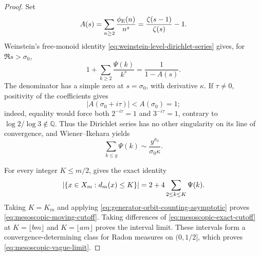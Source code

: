 \begin{proof}
Set
\[
 A(s)=\sum_{n\ge2}\frac{\phi_{\rm E}(n)}{n^s}
 =\frac{\zeta(s-1)}{\zeta(s)}-1.
\]
Weinstein's free-monoid identity \eqref{eq:weinstein-level-dirichlet-series}
gives, for \(\Re s>\sigma_0\),
\[
 1+\sum_{k\ge2}\frac{\Psi(k)}{k^s}=\frac1{1-A(s)}.
\]
The denominator has a simple zero at \(s=\sigma_0\), with derivative
\(\kappa\).  If \(\tau\ne0\), positivity of the coefficients gives
\[
 |A(\sigma_0+i\tau)|<A(\sigma_0)=1;
\]
indeed, equality would force both \(2^{-i\tau}=1\) and
\(3^{-i\tau}=1\), contrary to \(\log2/\log3\notin\mathbb Q\).
Thus the Dirichlet series has no other singularity on its line of
convergence, and Wiener--Ikehara \cite{Korevaar2004} yields
\begin{equation}
 \sum_{k\le y}\Psi(k)
 \sim\frac{y^{\sigma_0}}{\sigma_0\kappa}.
 \label{eq:generator-orbit-counting-asymptotic}
\end{equation}

For every integer \(K\le m/2\),  gives the
exact identity
\begin{equation}
 \lvert \{x\in X_m:d_m(x)\le K\} \rvert
 =2+4\sum_{2\le k\le K}\Psi(k).
 \label{eq:mesoscopic-exact-cutoff}
\end{equation}
Taking \(K=K_m\) and applying
\eqref{eq:generator-orbit-counting-asymptotic} proves
\eqref{eq:mesoscopic-moving-cutoff}.  Taking differences of
\eqref{eq:mesoscopic-exact-cutoff} at
\(K=\lfloor bm\rfloor\) and \(K=\lfloor am\rfloor\) proves the interval
limit.  These intervals form a convergence-determining class for Radon
measures on \((0,1/2]\), which proves \eqref{eq:mesoscopic-vague-limit}.
\end{proof}
\fi

